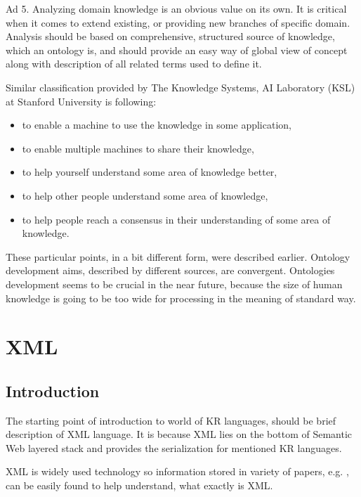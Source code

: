 Ad 5. Analyzing domain knowledge is an obvious value on its own. It is critical when it comes to extend existing, or providing new branches of specific domain. Analysis should be based on comprehensive, structured source of knowledge, which an ontology is, and should provide an easy way of global view of concept along with description of all related terms used to define it.

\bigskip

\noindent Similar classification provided by The Knowledge Systems, AI Laboratory (KSL) at Stanford University \cite{KSL} is following:
\begin{itemize}
    \setlength{\itemsep}{0cm}
    \setlength{\parskip}{0cm}

    \item to enable a machine to use the knowledge in some application,
    \item to enable multiple machines to share their knowledge,
    \item to help yourself understand some area of knowledge better,
    \item to help other people understand some area of knowledge,
    \item to help people reach a consensus in their understanding of some area of knowledge.
\end{itemize}

\noindent These particular points, in a bit different form, were described earlier. Ontology development aims, described by different sources, are convergent. Ontologies development seems to be crucial in the near future, because the size of human knowledge is going to be too wide for processing in the meaning of standard way.

\newpage

\section{XML}
\label{sec:xml}

\subsection{Introduction}
\label{sub:xmlIntroduction}

The starting point of introduction to world of KR languages, should be brief description of XML language. It is because XML lies on the bottom of Semantic Web layered stack and provides the serialization for mentioned KR languages.

XML is widely used technology so information stored in variety of papers, e.g. \cite{W3SchoolsXML, W3CXML}, can be easily found to help understand, what exactly is XML.

